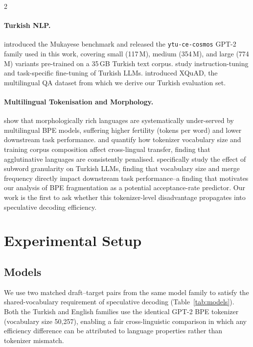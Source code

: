 \documentclass[11pt,a4paper]{article}
\begin{document}
\begin{multicols}{2}
\paragraph{Turkish NLP.}
\citet{safaya2022mukayese} introduced the Mukayese benchmark and released
the \texttt{ytu-ce-cosmos} GPT-2 family used in this work, covering
small (117\,M), medium (354\,M), and large (774\,M) variants pre-trained
on a 35\,GB Turkish text corpus.
\citet{toraman2023large} study instruction-tuning and task-specific
fine-tuning of Turkish LLMs.
\citet{artetxe2020cross} introduced XQuAD, the multilingual QA dataset
from which we derive our Turkish evaluation set.

\paragraph{Multilingual Tokenisation and Morphology.}
\citet{conneau2020unsupervised} show that morphologically rich languages
are systematically under-served by multilingual BPE models, suffering
higher fertility (tokens per word) and lower downstream task performance.
\citet{bostrom2020byte} and \citet{rust2021how} quantify how tokenizer
vocabulary size and training corpus composition affect cross-lingual
transfer, finding that agglutinative languages are consistently penalised.
\citet{kaya2022tokenization} specifically study the effect of subword
granularity on Turkish LLMs, finding that vocabulary size and merge
frequency directly impact downstream task performance--a finding that
motivates our analysis of BPE fragmentation as a potential acceptance-rate
predictor.
Our work is the first to ask whether this tokenizer-level disadvantage
propagates into speculative decoding efficiency.

\section{Experimental Setup}
\label{sec:setup}

\subsection{Models}

We use two matched draft–target pairs from the same model family to
satisfy the shared-vocabulary requirement of speculative decoding
(Table~\ref{tab:models}).
Both the Turkish and English families use the identical GPT-2 BPE
tokenizer (vocabulary size 50,257), enabling a fair cross-linguistic
comparison in which any efficiency difference can be attributed to language
properties rather than tokenizer mismatch.


\end{multicols}
\end{document}
